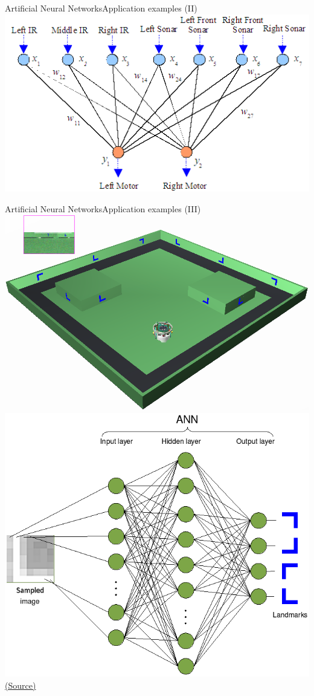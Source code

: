 \documentclass[10pt,compress]{beamer} %
\begin{document}
\begin{frame}{Artificial Neural Networks}{Application examples (II)}
	\centering\includegraphics[width=0.9\linewidth]{figs/robot.png}
\end{frame}

\begin{frame}{Artificial Neural Networks}{Application examples (III)}
	\centering\includegraphics[width=0.5\linewidth]{figs/world.png}
	\centering\includegraphics[width=0.5\linewidth]{figs/worldann.png}\\
	\scriptsize\href{https://en.wikibooks.org/wiki/Cyberbotics\%27\_Robot\_Curriculum/}{(Source)}
\end{frame}
\end{document}
